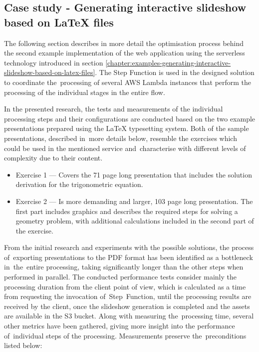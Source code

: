 \subsection{Case study - Generating interactive slideshow based on LaTeX files} \label{chapter:latex-processing-optimisation}

The following section describes in more detail the optimisation process behind the second example implementation of the web application using the serverless technology introduced in section \ref{chapter:examples-generating-interactive-slideshow-based-on-latex-files}.
The Step Function is used in the designed solution to coordinate the~processing of several AWS Lambda instances that perform the processing of the individual stages in the entire flow.

In the presented research, the tests and measurements of the individual processing steps and their configurations are conducted based on the two example presentations prepared using the LaTeX typesetting system.
Both of the sample presentations, described in~more details below, resemble the exercises which could be used in the mentioned service and~characterise with different levels of complexity due to their content.

\begin{itemize}
   \item Exercise 1 --- Covers the 71 page long presentation that includes the solution derivation for the trigonometric equation.
   \item Exercise 2 --- Is more demanding and larger, 103 page long presentation. The first part includes graphics and describes the required steps for solving a geometry problem, with additional calculations included in the second part of the exercise.
\end{itemize}

From the initial research and experiments with the possible solutions, the process of~exporting presentations to the PDF format has been identified as a bottleneck in~the~entire processing, taking significantly longer than the other steps when performed in parallel.
The conducted performance tests consider mainly the processing duration from the client point of view, which is calculated as a time from requesting the invocation of~Step~Function, until the processing results are received by the client, once the slideshow generation is completed and the assets are available in the S3 bucket.
Along with measuring the~processing time, several other metrics have been gathered, giving more insight into the performance of~individual steps of the processing.
Measurements preserve the~preconditions listed below:

